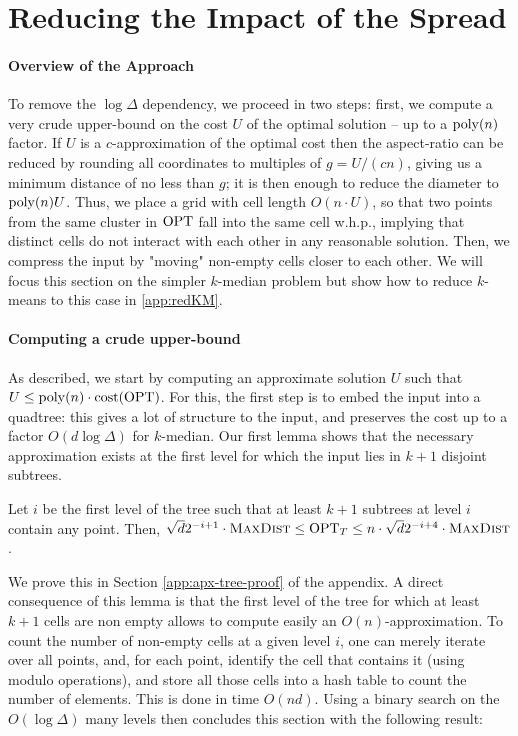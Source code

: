 \section{Reducing the Impact of the Spread}
\label{sec:logdelta}
\newcommand{\boxsize}{\textsc{MaxDist}}

\paragraph*{Overview of the Approach}

To remove the $\log\Delta$ dependency, we proceed in two steps: first, we compute a very crude upper-bound on the cost $U$ of the optimal solution -- up to
a $\operatorname{poly}(n)$ factor.  If $U$ is a $c$-approximation of the optimal cost then the aspect-ratio can be reduced by rounding all coordinates to multiples of $g
= U/(cn)$, giving us a minimum distance of no less than $g$; it is then enough to reduce the diameter to $\operatorname{poly}(n) U$.  Thus, we place a grid with cell length
$O(n \cdot U)$, so that two points from the same cluster in $\text{OPT}$ fall into the same cell w.h.p., implying that distinct cells do not interact with each other
in any reasonable solution.  Then, we compress the input by "moving" non-empty cells closer to each other. We will focus this section on the simpler $k$-median
problem but show how to reduce $k$-means to this case in \cref{app:redKM}.


\paragraph*{Computing a crude upper-bound}

As described, we start by computing an approximate solution $U$ such that $U \leq \operatorname{poly}(n) \cdot \operatorname{cost}(\text{OPT})$. For this, the first step is to embed the input
into a quadtree: this gives a lot of structure to the input, and preserves the cost up to a factor $O(d \log \Delta)$ for $k$-median.  Our first lemma shows
that the necessary approximation exists at the first level for which the input lies in $k+1$ disjoint subtrees. 

\begin{lemma}\label{lem:apxTree}
Let $i$ be the first level of the tree such that at least $k+1$ subtrees at level $i$ contain any point. Then, $\sqrt{d}2^{-i+1} \cdot \boxsize \leq
\opt_T \leq n \cdot \sqrt{d}2^{-i+4} \cdot \boxsize$.
\end{lemma}

We prove this in Section \ref{app:apx-tree-proof} of the appendix. A direct consequence of this lemma is that the first level of the tree for which at least
$k+1$ cells are non empty allows to compute easily an $O(n)$-approximation. To count the number of non-empty cells at a given level $i$, one can merely iterate over all
points, and, for each point, identify the cell that contains it (using modulo operations), and store all those cells into a hash table to count the number of elements.
This is done in time $O(nd)$.  Using a binary search on the $O(\log \Delta)$ many levels then concludes this section with the following result:

